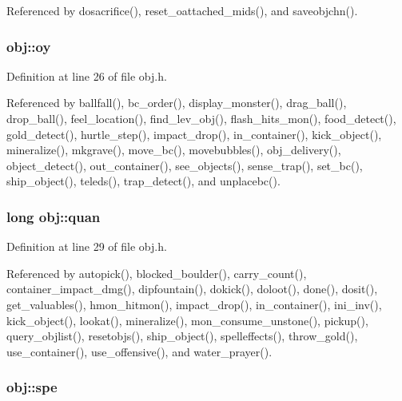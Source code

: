 Referenced by dosacrifice(), reset\+\_\+oattached\+\_\+mids(), and saveobjchn().

\hypertarget{structobj_a72dace5e678b56ae42c3fb19292e5839}{
\subsubsection[{oy}]{ obj\+::oy}}\label{structobj_a72dace5e678b56ae42c3fb19292e5839}


Definition at line 26 of file obj.\+h.



Referenced by ballfall(), bc\+\_\+order(), display\+\_\+monster(), drag\+\_\+ball(), drop\+\_\+ball(), feel\+\_\+location(), find\+\_\+lev\+\_\+obj(), flash\+\_\+hits\+\_\+mon(), food\+\_\+detect(), gold\+\_\+detect(), hurtle\+\_\+step(), impact\+\_\+drop(), in\+\_\+container(), kick\+\_\+object(), mineralize(), mkgrave(), move\+\_\+bc(), movebubbles(), obj\+\_\+delivery(), object\+\_\+detect(), out\+\_\+container(), see\+\_\+objects(), sense\+\_\+trap(), set\+\_\+bc(), ship\+\_\+object(), teleds(), trap\+\_\+detect(), and unplacebc().

\hypertarget{structobj_ad08c0ed1a746fbb52377ecd7e4220578}{
\subsubsection[{quan}]{\setlength{\rightskip}{0pt plus 5cm}long obj\+::quan}}\label{structobj_ad08c0ed1a746fbb52377ecd7e4220578}


Definition at line 29 of file obj.\+h.



Referenced by autopick(), blocked\+\_\+boulder(), carry\+\_\+count(), container\+\_\+impact\+\_\+dmg(), dipfountain(), dokick(), doloot(), done(), dosit(), get\+\_\+valuables(), hmon\+\_\+hitmon(), impact\+\_\+drop(), in\+\_\+container(), ini\+\_\+inv(), kick\+\_\+object(), lookat(), mineralize(), mon\+\_\+consume\+\_\+unstone(), pickup(), query\+\_\+objlist(), resetobjs(), ship\+\_\+object(), spelleffects(), throw\+\_\+gold(), use\+\_\+container(), use\+\_\+offensive(), and water\+\_\+prayer().

\hypertarget{structobj_a14fc8dc59e9073bfbf1e170875a98448}{
\subsubsection[{spe}]{ obj\+::spe}}\label{structobj_a14fc8dc59e9073bfbf1e170875a98448}


